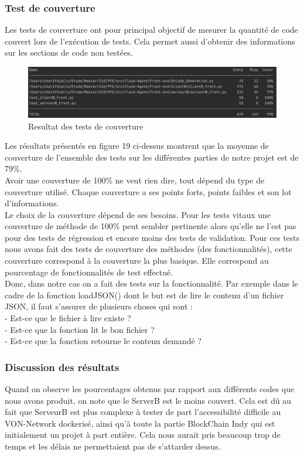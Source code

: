 \documentclass[12pt, openany]{report}
\begin{document}
\begin{flushleft}
\subsubsection{Test de couverture}
Les tests de couverture ont pour principal objectif de mesurer la quantité de code couvert lors de l'exécution de tests. Cela permet aussi d'obtenir des informations sur les sections de code non testées.
\begin{figure}[H]
\includegraphics[scale=0.5]{coverage.png}
\centering
\caption{Resultat des tests de couverture}
\end{figure}

Les résultats présentés en figure 19 ci-dessus montrent que la moyenne de couverture de l'ensemble des tests sur les différentes parties de notre projet est de 79\%.\\
Avoir une couverture de 100\% ne veut rien dire, tout dépend du type de couverture utilisé. Chaque couverture a ses points forts, points faibles et son lot d’informations.\\
Le choix de la couverture dépend de ses besoins.
Pour les tests vitaux une couverture de méthode de 100\% peut sembler pertinente alors qu’elle ne l’est pas pour des tests de régression et encore moins des tests de validation. Pour ces tests
nous avons fait des tests de couverture des méthodes (des fonctionnalités), cette couverture correspond à la couverture la plus basique. Elle correspond au pourcentage de fonctionnalités  de test effectué.\\
Donc, dans notre cas on a fait des tests sur la fonctionnalité. Par exemple dans le cadre de la fonction loadJSON() dont le but est de lire le contenu d'un fichier JSON, il faut s'assurer de plusieurs choses qui sont :\\
- Est-ce que le fichier à lire existe ?\\
- Est-ce que la fonction lit le bon fichier ?\\
- Est-ce que la fonction retourne le contenu demandé ?\\

\subsubsection{Discussion des résultats}
Quand on observe les pourcentages obtenus par rapport aux différents codes que nous avons produit, on note que le ServerB est le moins couvert. Cela est dû au fait que ServeurB est plus complexe à tester de part l'accessibilité difficile au VON-Network dockerisé, ainsi qu'à toute la partie BlockChain Indy qui est initialement un projet à part entière. Cela nous aurait pris beaucoup trop de temps et les délais ne permettaient pas de s'attarder dessus.

\end{flushleft}
\end{document}
